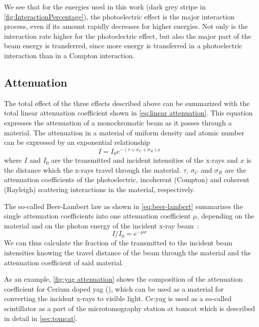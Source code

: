 We see that for the energies used in this work (dark grey stripe in \autoref{fig:InteractionPercentage}), the photoelectric effect is the major interaction process, even if its amount rapidly decreases for higher energies. Not only is the interaction rate higher for the photoelectric effect, but also the major part of the beam energy is transferred, since more energy is transferred in a photoelectric interaction than in a Compton interaction.

\subsection{Attenuation}
The total effect of the three effects described above can be summarized with the total linear attenuation coefficient shown in \autoref{eq:linear attenuation}. This equation expresses the attenuation of a monochromatic beam as it passes through a material. The attenuation in a material of uniform density and atomic number can be expressed by an exponential relationship
\begin{equation}%
	I=I_{0}e^{-(\tau+\sigma_{C}+\sigma_{R})x}%
	\label{eq:linear attenuation}%
\end{equation}%
where $I$ and $I_{0}$ are the transmitted and incident intensities of the x-rays and $x$ is the distance which the x-rays travel through the material. $\tau$, $\sigma_{C}$ and $\sigma_{R}$ are the attenuation coefficients of the photoelectric, incoherent (Compton) and coherent (Rayleigh) scattering interactions in the material, respectively.

The so-called Beer-Lambert law as shown in \autoref{eq:beer-lambert} summarizes the single attenuation coefficients into one attenuation coefficient $\mu$, depending on the material and on the photon energy of the incident x-ray beam~\cite{Hsieh2003}:
\begin{equation}
	I/I_{0}=e^{-\mu x}
	\label{eq:beer-lambert}
\end{equation}%
We can thus calculate the fraction of the transmitted to the incident beam intensities knowing the travel distance of the beam through the material and the attenuation coefficient of said material.

As an example, \autoref{fig:yag attenuation} shows the composition of the attenuation coefficient for Cerium doped \ac{yag} (), which can be used as a material for converting the incident x-rays to visible light. Ce:\ac{yag} is used as a so-called scintillator as a part of the microtomography station at \ac{tomcat} which is described in detail in \autoref{sec:tomcat}.

